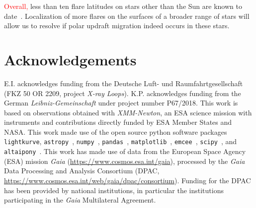 \documentclass[twocolumn]{aastex631}
\begin{document}
\textcolor{red}{Overall, }less than ten flare latitudes on stars other than the Sun are known to date~\citep{wolter2008doppler, ilin2021giant, johnson2021simultaneous}. Localization of more flares on the surfaces of a broader range of stars will allow us to resolve if polar updraft migration indeed occurs in these stars.



\section*{Acknowledgements}
 E.I. acknowledges funding from the Deutsche Luft- und Raumfahrtgesellschaft (FKZ 50 OR 2209, project \textit{X-ray Loops}). K.P. acknowledges funding from the German \textit{Leibniz-Gemeinschaft} under project number P67/2018. This work is based on observations obtained with \textit{XMM-Newton}, an ESA science mission with instruments and contributions directly funded by ESA Member States and NASA. This work made use of the open source python software packages \texttt{lightkurve}\citep{lightkurvecollaboration2018lightkurve}, \texttt{astropy}~\citep{robitaille2013astropy}, \texttt{numpy}~\citep{harris2020array}, \texttt{pandas}~\citep{reback2022pandasdev}, \texttt{matplotlib}~\citep{hunter2007matplotlib}, \texttt{emcee}~\citep{foreman-mackey2013emcee}, \texttt{scipy}~\citep{mckinney2010data}, and \texttt{altaipony}~\citep{ilin2021altaipony}. This work has made use of data from the European Space Agency (ESA) mission
{\it Gaia} (\url{https://www.cosmos.esa.int/gaia}), processed by the {\it Gaia}
Data Processing and Analysis Consortium (DPAC,
\url{https://www.cosmos.esa.int/web/gaia/dpac/consortium}). Funding for the DPAC
has been provided by national institutions, in particular the institutions
participating in the {\it Gaia} Multilateral Agreement.
\end{document}
